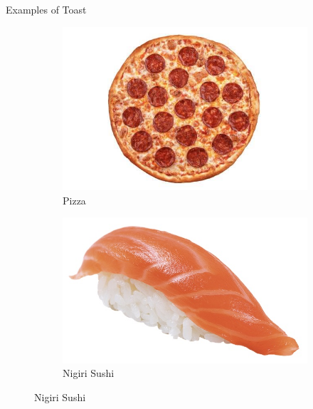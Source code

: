 \documentclass{beamer}
\begin{document}
\begin{frame}{Examples of Toast}
    \begin{figure}
        \begin{subfigure}{.4\textwidth}
          \centering
          \includegraphics[width=.8\linewidth]{images/cube_rule_of_food/toast/17_pizza.jpg}
          \caption{\label{fig:pizza}Pizza}
        \end{subfigure}%
        \begin{subfigure}{.4\textwidth}
          \centering
          \includegraphics[width=.8\linewidth]{images/cube_rule_of_food/toast/17_nigiri.jpg}
          \caption{\label{fig:nigiri}Nigiri Sushi}

\end{subfigure}
\end{figure}
\end{frame}
\end{document}
